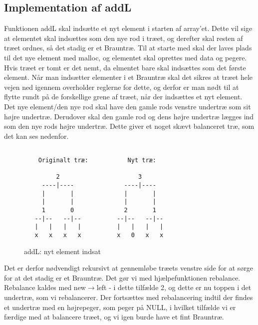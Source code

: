 \documentclass[10pt,a4paper,danish]{article}
\begin{document}
\subsection{Implementation af addL}
Funktionen addL skal indsætte et nyt element i starten af array'et. Dette vil sige at elementet skal indsættes som den nye rod i træet, og derefter skal resten af træet ordnes, så det stadig er et Brauntræ. Til at starte med skal der laves plads til det nye element med malloc, og elementet skal oprettes med data og pegere. Hvis træet er tomt er det nemt, da elmentet bare skal indsættes som det første element. Når man indsætter elementer i et Brauntræ skal det sikres at træet hele vejen ned igennem overholder reglerne for dette, og derfor er man nødt til at flytte rundt på de forskellige grene af træet, når der indsættes et nyt element. Det nye element/den nye rod skal have den gamle rods venstre undertræ som sit højre undertræ. Derudover skal den gamle rod og dens højre undertræ lægges ind som den nye rods højre undertræ. Dette giver et noget skævt balanceret træ, som det kan ses nedenfor.

\begin{figure}[tb!]
  \centering
  \begin{center}
\begin{verbatim}

    Originalt træ:           Nyt træ:

         2                      3
     ----|----              ----|----
     |       |              |       |
     |       |              |       |
     1       0              2       1
   --|--   --|--          --|--   --|--
   |   |   |   |          |   |   |   |
   x   x   x   x          x   0   x   x

\end{verbatim}
  \end{center}
  \caption{addL: nyt element indsat}
  \label{fig:addl}
\end{figure}

Det er derfor nødvendigt rekursivt at gennemløbe træets venstre side for at sørge for at det stadig er et Brauntræ. Det gør vi med hjælpefunktionen rebalance. Rebalance kaldes med new$\rightarrow$left - i dette tilfælde 2, og dette er nu toppen i det undertræ, som vi rebalancerer. Der fortsættes med rebalancering indtil der findes et undertræ med en højrepeger, som peger på NULL, i hvilket tilfælde vi er færdige med at balancere træet, og vi igen burde have et fint Brauntræ.
\end{document}
